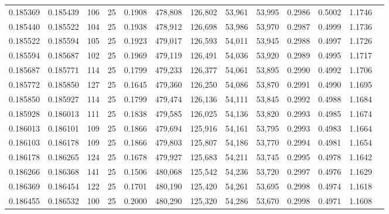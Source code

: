 \begin{tabular}{rrrrrrrrrrrrr}
0.185369 & 0.185439 &   106 &  25 &                                     0.1908 & 478,808 & 126,802 &  53,961 &  53,995 & 0.2986 & 0.5002 & 1.1746 \\
0.185440 & 0.185522 &   104 &  25 &                                     0.1938 & 478,912 & 126,698 &  53,986 &  53,970 & 0.2987 & 0.4999 & 1.1736 \\
0.185522 & 0.185594 &   105 &  25 &                                     0.1923 & 479,017 & 126,593 &  54,011 &  53,945 & 0.2988 & 0.4997 & 1.1726 \\
0.185594 & 0.185687 &   102 &  25 &                                     0.1969 & 479,119 & 126,491 &  54,036 &  53,920 & 0.2989 & 0.4995 & 1.1717 \\
0.185687 & 0.185771 &   114 &  25 &                                     0.1799 & 479,233 & 126,377 &  54,061 &  53,895 & 0.2990 & 0.4992 & 1.1706 \\
0.185772 & 0.185850 &   127 &  25 &                                     0.1645 & 479,360 & 126,250 &  54,086 &  53,870 & 0.2991 & 0.4990 & 1.1695 \\
0.185850 & 0.185927 &   114 &  25 &                                     0.1799 & 479,474 & 126,136 &  54,111 &  53,845 & 0.2992 & 0.4988 & 1.1684 \\
0.185928 & 0.186013 &   111 &  25 &                                     0.1838 & 479,585 & 126,025 &  54,136 &  53,820 & 0.2993 & 0.4985 & 1.1674 \\
0.186013 & 0.186101 &   109 &  25 &                                     0.1866 & 479,694 & 125,916 &  54,161 &  53,795 & 0.2993 & 0.4983 & 1.1664 \\
0.186103 & 0.186178 &   109 &  25 &                                     0.1866 & 479,803 & 125,807 &  54,186 &  53,770 & 0.2994 & 0.4981 & 1.1654 \\
0.186178 & 0.186265 &   124 &  25 &                                     0.1678 & 479,927 & 125,683 &  54,211 &  53,745 & 0.2995 & 0.4978 & 1.1642 \\
0.186266 & 0.186368 &   141 &  25 &                                     0.1506 & 480,068 & 125,542 &  54,236 &  53,720 & 0.2997 & 0.4976 & 1.1629 \\
0.186369 & 0.186454 &   122 &  25 &                                     0.1701 & 480,190 & 125,420 &  54,261 &  53,695 & 0.2998 & 0.4974 & 1.1618 \\
0.186455 & 0.186532 &   100 &  25 &                                     0.2000 & 480,290 & 125,320 &  54,286 &  53,670 & 0.2998 & 0.4971 & 1.1608 \\

\end{tabular}
